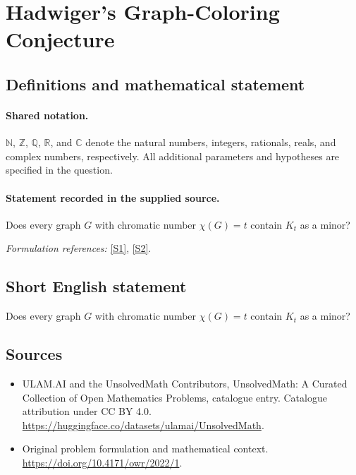 \documentclass[11pt]{article}
\newcommand{\sref}[2]{\hyperlink{source:#1:#2}{[S#2]}}
\begin{document}
\section{Hadwiger’s Graph-Coloring Conjecture}\label{statement}

\subsection{Definitions and mathematical statement}

\paragraph{Shared notation.}$\mathbb N$, $\mathbb Z$, $\mathbb Q$, $\mathbb R$, and $\mathbb C$ denote the natural numbers, integers, rationals, reals, and complex numbers, respectively. All additional parameters and hypotheses are specified in the question.


\paragraph{Statement recorded in the supplied source.}
Does every graph $G$ with chromatic number $\chi(G)=t$ contain $K_t$ as a minor?
\par\smallskip\textit{Formulation references:} \sref{statement}{1}, \sref{statement}{2}.
\subsection{Short English statement}
Does every graph $G$ with chromatic number $\chi(G)=t$ contain $K_t$ as a minor?
\subsection{Sources}
\begin{itemize}
\item[\hypertarget{source:statement:1}{S1}] ULAM.AI and the UnsolvedMath Contributors, UnsolvedMath: A Curated Collection of Open Mathematics Problems, catalogue entry. Catalogue attribution under CC BY 4.0.
\url{https://huggingface.co/datasets/ulamai/UnsolvedMath}.
\item[\hypertarget{source:statement:2}{S2}] Original problem formulation and mathematical context.
\url{https://doi.org/10.4171/owr/2022/1}.
\end{itemize}
\label{end:statement}
\end{document}
